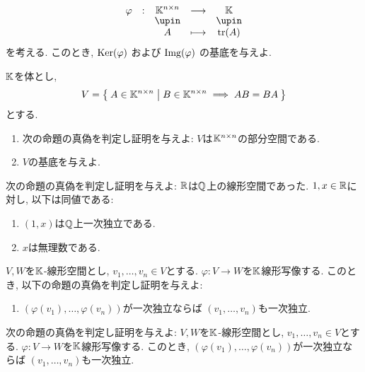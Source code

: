 \begin{quiz}
  \begin{align*}
    \shazo{\varphi}{\KK^{n\times n}}{\KK}
    {A}{\tr(A)}
  \end{align*}
  を考える.
  このとき,
  $\operatorname{Ker}(\varphi)$
  および
  $\operatorname{Img}(\varphi)$
  の基底を与えよ.
\end{quiz}

\begin{quiz}
  $\mathbb{K}$を体とし,
  \begin{align*}
    V=
    \Set{A\in\mathbb{K}^{n\times n} | B\in \mathbb{K}^{n\times n} \implies AB=BA}
  \end{align*}
  とする.
  \begin{enumerate}
  \item
    次の命題の真偽を判定し証明を与えよ:
    $V$は$\mathbb{K}^{n\times n}$の部分空間である.
  \item
    $V$の基底を与えよ.
  \end{enumerate}
\end{quiz}

\begin{quiz}
  次の命題の真偽を判定し証明を与えよ:
  $\mathbb{R}$は$\mathbb{Q}$上の線形空間であった.
  $1,x\in\mathbb{R}$に対し, 以下は同値である:
  \begin{enumerate}
  \item $(1,x)$は$\mathbb{Q}$上一次独立である.
  \item $x$は無理数である.
  \end{enumerate}
\end{quiz}


\begin{quiz}
  $V,W$を$\mathbb{K}$-線形空間とし,
  $v_1,\ldots,v_n\in V$とする.
  $\varphi\colon V\to W$を$\mathbb{K}$線形写像する.
  このとき,
  以下の命題の真偽を判定し証明を与えよ:
  \begin{enumerate}
  \item    
    $(\varphi(v_1),\ldots,\varphi(v_n))$が一次独立ならば
    $(v_1,\ldots,v_n)$も一次独立.
  \end{enumerate}
\end{quiz}

\begin{quiz}
  次の命題の真偽を判定し証明を与えよ:
  $V,W$を$\mathbb{K}$-線形空間とし,
  $v_1,\ldots,v_n\in V$とする.
  $\varphi\colon V\to W$を$\mathbb{K}$線形写像する.
  このとき,
  $(\varphi(v_1),\ldots,\varphi(v_n))$が一次独立ならば
  $(v_1,\ldots,v_n)$も一次独立.
\end{quiz}

